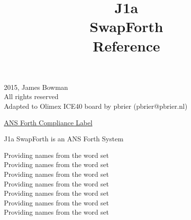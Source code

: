 %
%



\title{\LARGE \bf
J1a\\
SwapForth \\
Reference
}



\maketitle

\begingroup
\footnotesize
\parindent 0pt
\parskip \baselineskip
\textcopyright{} 2015, James Bowman \\
All rights reserved \\
Adapted to Olimex ICE40 board by pbrier (pbrier@pbrier.nl)
\begin{framed}

\underline{ANS Forth Compliance Label}

J1a SwapForth is an ANS Forth System

Providing names from the  word set \\
Providing names from the  word set \\
Providing names from the  word set \\
Providing names from the  word set \\
Providing names from the  word set \\
Providing names from the  word set \\
Providing names from the  word set

\end{framed}

